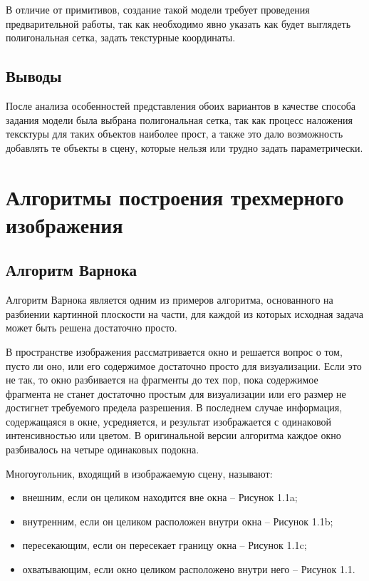 \documentclass[12pt,a4paper,oneside]{report}
\begin{document}
	 В отличие от примитивов, создание такой модели требует проведения предварительной работы, так как необходимо явно указать как будет выглядеть полигональная сетка, задать текстурные координаты.
	
	\subsection{Выводы}
	 \quad После анализа особенностей представления обоих вариантов в качестве способа задания модели была выбрана полигональная сетка, так как процесс наложения тексктуры для таких объектов наиболее прост, а также это дало возможность добавлять те объекты в сцену, которые нельзя или трудно задать параметрически.
	
	\section{Алгоритмы построения трехмерного изображения}
	
	\subsection{Алгоритм Варнока}
	
	 \quad Алгоритм Варнока является одним из примеров алгоритма, основанного на разбиении картинной плоскости на части, для каждой из которых исходная задача может быть решена достаточно просто\cite{f}. 
	
	 В пространстве изображения рассматривается окно и решается вопрос о том, пусто ли оно, или его содержимое достаточно просто для визуализации. Если это не так, то окно разбивается на фрагменты до тех пор, пока содержимое фрагмента не станет достаточно простым для визуализации или его размер не достигнет требуемого предела разрешения. В последнем случае информация, содержащаяся в окне, усредняется, и результат изображается с одинаковой интенсивностью или цветом. В оригинальной версии алгоритма каждое окно разбивалось на четыре одинаковых подокна. 
	
	 Многоугольник, входящий в изображаемую сцену, называют:
	\begin{itemize}
		\item внешним, если он целиком находится вне окна – Рисунок 1.1a;
		\item внутренним, если он целиком расположен внутри окна – Рисунок 1.1b;
		\item пересекающим, если он пересекает границу окна – Рисунок 1.1c;
		\item охватывающим, если окно целиком расположено внутри него – Рисунок 1.1.
	\end{itemize}
	
\end{document}
